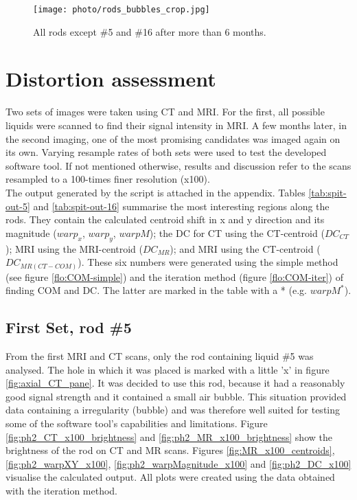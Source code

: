 \begin{figure}[tbh!]
\centering
\texttt{[image: photo/rods\_bubbles\_crop.jpg]}
\caption{All rods except \#5 and \#16 after more than 6 months.}
\label{fig:bubbles}
\end{figure}



\section{Distortion assessment}

Two sets of images were taken using CT and MRI.
For the first, all possible liquids were scanned to find their signal intensity in MRI.
A few months later, in the second imaging, one of the most promising candidates was imaged again on its own.
Varying resample rates of both sets were used to test the developed software tool.
If not mentioned otherwise, results and discussion refer to the scans resampled to a 100-times finer resolution (x100). \\

The output generated by the script is attached in the appendix.
Tables \ref{tab:spit-out-5} and \ref{tab:spit-out-16} summarise the most interesting regions along the rods.
They contain the calculated centroid shift in x and y direction and its magnitude ($warp_x$, $warp_y$, $warpM$); the DC for CT using the CT-centroid ($DC_{CT}$); MRI using the MRI-centroid ($DC_{MR}$); and MRI using the CT-centroid ($DC_{MR(CT-COM)}$).
These six numbers were generated using the simple method (see figure \ref{flo:COM-simple}) and the iteration method (figure \ref{flo:COM-iter}) of finding COM and DC.
The latter are marked in the table with a * (e.g. $warpM^*$).

\subsection{First Set, rod \#5}
\label{sec:rod5}

From the first MRI and CT scans, only the rod containing liquid \#5 was analysed.
The hole in which it was placed is marked with a little 'x' in figure \ref{fig:axial_CT_pane}.
It was decided to use this rod, because it had a reasonably good signal strength and it contained a small air bubble.
This situation provided data containing a irregularity (bubble) and was therefore well suited for testing some of the software tool's capabilities and limitations.
Figure \ref{fig:ph2_CT_x100_brightness} and \ref{fig:ph2_MR_x100_brightness} show the brightness of the rod on CT and MR scans.
Figures \ref{fig:MR_x100_centroids}, \ref{fig:ph2_warpXY_x100}, \ref{fig:ph2_warpMagnitude_x100} and \ref{fig:ph2_DC_x100} visualise the calculated output.
All plots were created using the data obtained with the iteration method.

